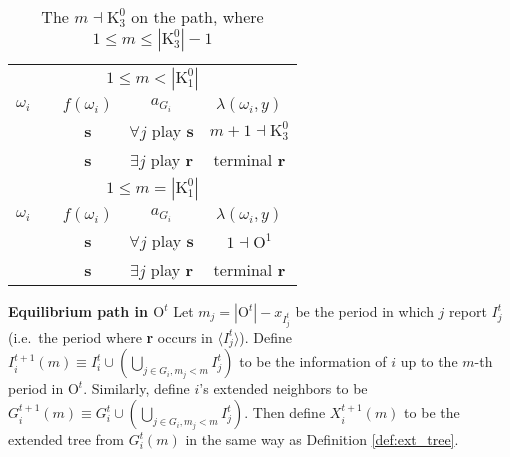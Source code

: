 \documentclass[12pt,letter]{article}
\newcommand{\Kappa}{\mathrm{K}}
\newcommand{\Omicron}{\mathrm{O}}
\theoremstyle{definition}
\theoremstyle{remark}
\theoremstyle{claim}
\begin{document}
\clearpage

\begin{table}[!htbp]
\caption{The $m\dashv\Kappa^0_{3}$ on the path, where $1\leq m \leq |\Kappa^0_3|-1$}
\begin{center}
\begin{tabular}{c c | c | c | c}
\multicolumn{5}{c}{$1\leq m < |\Kappa^0_1|$}\\
$\omega_i$ 	 & 	   &	$f(\omega_i)$  &	$a_{G_i}$ & $\lambda(\omega_i,y)$ \\
\hline
\hline
  	&	& \textbf{s} & $\forall j$ play $\textbf{s}$ 	& $m+1\dashv \Kappa^0_{3}$\\
  	&  & \textbf{s}  &  $\exists j$ play $\textbf{r}$  	& terminal \textbf{r}\\
\hline
\multicolumn{5}{c}{$1\leq m = |\Kappa^0_1|$}\\
$\omega_i$ 	 & 	   &	$f(\omega_i)$  &	$a_{G_i}$ & $\lambda(\omega_i,y)$ \\
\hline
\hline
  	& 	& \textbf{s} & $\forall j$ play $\textbf{s}$ 	& $1\dashv \Omicron^1$\\
  	&  & \textbf{s}  &  $\exists j$ play $\textbf{r}$  	& terminal \textbf{r}\\
\hline
\end{tabular}
\end{center}
\end{table}





\clearpage

\noindent \textbf{Equilibrium path in $\Omicron^t$}
Let $m_j=|\Omicron^t|-x_{I^t_j}$ be the period in which $j$ report $I^t_j$ (i.e.~the period where \textbf{r} occurs in $\langle I^t_j \rangle$). Define $I^{t+1}_i(m)\equiv I^t_i\cup(\bigcup_{j\in G_i, m_j<m}I^t_j)$ to be the information of $i$ up to the $m$-th period in $\Omicron^t$. Similarly, define $i$'s extended neighbors to be $G^{t+1}_i(m)\equiv G^t_i\cup(\bigcup_{j\in G_i, m_j<m}I^t_j)$. Then define $X^{t+1}_i(m)$ to be the extended tree from $G^t_i(m)$ in the same way as Definition \ref{def:ext_tree}.
\end{document}
